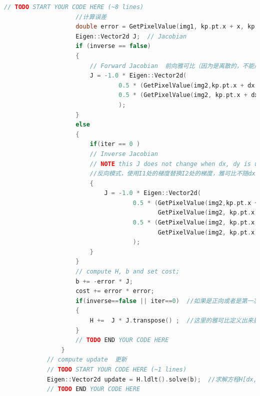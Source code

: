\documentclass[40pt,a4paper，UTF8]{ctexart}
\numberwithin{equation}{section}
\begin{document}
\begin{lstlisting}[language=C++, caption=forward-addtive Gauss-Newton 光流的实现核心代码]
                    // TODO START YOUR CODE HERE (~8 lines)
                    //计算误差
                    double error = GetPixelValue(img1, kp.pt.x + x, kp.pt.y + y)-GetPixelValue(img2, kp.pt.x + x + dx, kp.pt.y + y + dy);
                    Eigen::Vector2d J;  // Jacobian
                    if (inverse == false)
                    {
                        // Forward Jacobian  前向雅可比（因为是离散的，不能用微分，使用中心差分方式来进行求导）
                        J = -1.0 * Eigen::Vector2d(
                                0.5 * (GetPixelValue(img2,kp.pt.x + dx + x + 1, kp.pt.y + dy + y)-GetPixelValue(img2, kp.pt.x + dx + x -1, kp.pt.y + dy + y)),
                                0.5 * (GetPixelValue(img2, kp.pt.x + dx + x, kp.pt.y+ dy + y + 1)- GetPixelValue(img2, kp.pt.x + dx + x, kp.pt.y + dy + y -1))
                                );
                    }
                    else
                    {
                        if(iter == 0 )
                        // Inverse Jacobian
                        // NOTE this J does not change when dx, dy is updated, so we can store it and only compute error
                        //反向模式，使用I1处的梯度替换I2处的梯度，雅可比不随dx，dy的改变而改变，所以不加dx，dy
                        {
                            J = -1.0 * Eigen::Vector2d(
                                    0.5 * (GetPixelValue(img2,kp.pt.x + x + 1, kp.pt.y + y)-
                                           GetPixelValue(img2, kp.pt.x +  x -1, kp.pt.y + y)),
                                    0.5 * (GetPixelValue(img2, kp.pt.x +  x, kp.pt.y + y + 1)-
                                           GetPixelValue(img2, kp.pt.x +  x, kp.pt.y + y -1))
                                    );
                        }
                    }
                    // compute H, b and set cost;
                    b += -error * J;
                    cost += error * error;
                    if(inverse==false || iter==0)  //如果是正向或者是第一次迭代，就需要更新系数矩阵H
                    {
                        H +=  J * J.transpose() ;  //这里的雅可比定义出来是J^T，直接就是向量，求H要得是矩阵，所以得J*J^T
                    }
                    // TODO END YOUR CODE HERE
                }
            // compute update  更新
            // TODO START YOUR CODE HERE (~1 lines)
            Eigen::Vector2d update = H.ldlt().solve(b);  //求解方程H[dx,dy]^T=b
            // TODO END YOUR CODE HERE
\end{lstlisting}
\end{document}
